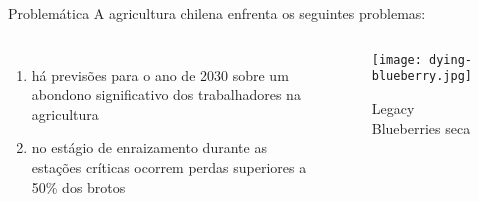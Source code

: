 \begin{frame}[t]{Problemática} 
    \transdissolve[duration=0.5]
    A agricultura chilena enfrenta os seguintes problemas:
        \begin{columns}[t]
                \begin{enumerate}
                    \item há previsões para o ano de 2030 sobre um abondono significativo dos trabalhadores na agricultura
                    \item no estágio de enraizamento durante as estações críticas ocorrem perdas superiores a 50\% dos brotos
                \end{enumerate}
            \vspace{-0.5cm}
            \begin{center}
                \begin{figure}
                    \caption{Legacy Blueberries seca}
                    \texttt{[image: dying-blueberry.jpg]}
                \end{figure}
            \end{center}
        \end{columns}
\end{frame}
